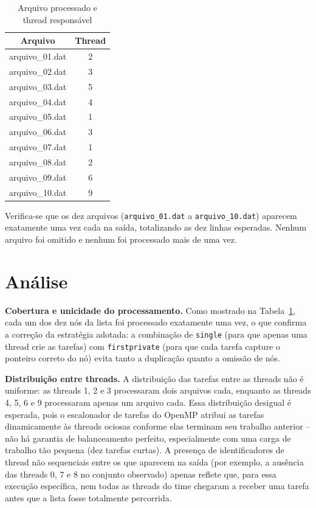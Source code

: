 \documentclass[a4paper,12pt]{article}
\begin{document}
\begin{table}[h]
\centering
\caption{Arquivo processado e thread responsável}
\label{tab:resultados}
\begin{tabular}{@{}cc@{}}
\toprule
\textbf{Arquivo} & \textbf{Thread} \\
\midrule
arquivo\_01.dat & 2 \\
arquivo\_02.dat & 3 \\
arquivo\_03.dat & 5 \\
arquivo\_04.dat & 4 \\
arquivo\_05.dat & 1 \\
arquivo\_06.dat & 3 \\
arquivo\_07.dat & 1 \\
arquivo\_08.dat & 2 \\
arquivo\_09.dat & 6 \\
arquivo\_10.dat & 9 \\
\bottomrule
\end{tabular}
\end{table}

Verifica-se que os dez arquivos (\texttt{arquivo\_01.dat} a \texttt{arquivo\_10.dat}) aparecem exatamente uma vez cada na saída, totalizando as dez linhas esperadas. Nenhum arquivo foi omitido e nenhum foi processado mais de uma vez.

\section{Análise}

\textbf{Cobertura e unicidade do processamento.} Como mostrado na Tabela~\ref{tab:resultados}, cada um dos dez nós da lista foi processado exatamente uma vez, o que confirma a correção da estratégia adotada: a combinação de \texttt{single} (para que apenas uma thread crie as tarefas) com \texttt{firstprivate} (para que cada tarefa capture o ponteiro correto do nó) evita tanto a duplicação quanto a omissão de nós.

\textbf{Distribuição entre threads.} A distribuição das tarefas entre as threads não é uniforme: as threads 1, 2 e 3 processaram dois arquivos cada, enquanto as threads 4, 5, 6 e 9 processaram apenas um arquivo cada. Essa distribuição desigual é esperada, pois o escalonador de tarefas do OpenMP atribui as tarefas dinamicamente às threads ociosas conforme elas terminam seu trabalho anterior -- não há garantia de balanceamento perfeito, especialmente com uma carga de trabalho tão pequena (dez tarefas curtas). A presença de identificadores de thread não sequenciais entre os que aparecem na saída (por exemplo, a ausência das threads 0, 7 e 8 no conjunto observado) apenas reflete que, para essa execução específica, nem todas as threads do time chegaram a receber uma tarefa antes que a lista fosse totalmente percorrida.
\end{document}
